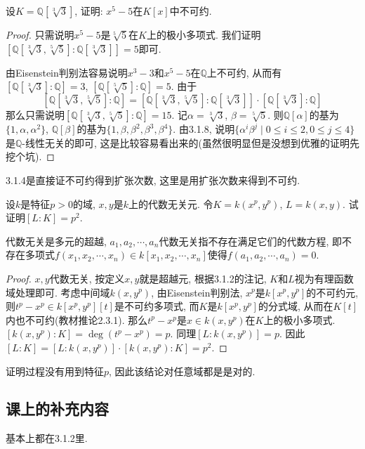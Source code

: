 \documentclass{../solutions-cn}
\begin{document}
\begin{exercise}[习题3.1.14]
    设$K = \mathbb{Q}[\sqrt[3]{3}]$, 证明: $x^5 - 5$在$K[x]$中不可约.
\end{exercise}

\begin{proof}
    只需说明$x^5 - 5$是$\sqrt[5]{5}$在$K$上的极小多项式. 我们证明$\left[\mathbb{Q}[\sqrt[3]{3}, \sqrt[5]{5}]:\mathbb{Q}[\sqrt[3]{3}]\right] = 5$即可.

    由Eisenstein判别法容易说明$x^3 - 3$和$x^5 - 5$在$\mathbb{Q}$上不可约, 从而有$\left[\mathbb{Q}[\sqrt[3]{3}]:\mathbb{Q}\right] = 3$, $\left[\mathbb{Q}[\sqrt[5]{5}]:\mathbb{Q}\right] = 5$. 由于
    \[
        \left[\mathbb{Q}[\sqrt[3]{3}, \sqrt[5]{5}]:\mathbb{Q}\right] = \left[\mathbb{Q}[\sqrt[3]{3}, \sqrt[5]{5}]:\mathbb{Q}[\sqrt[3]{3}]\right] \cdot \left[\mathbb{Q}[\sqrt[3]{3}]:\mathbb{Q}\right]
    \]
    那么只需说明$\left[\mathbb{Q}[\sqrt[3]{3}, \sqrt[5]{5}]:\mathbb{Q}\right] = 15$. 记$\alpha = \sqrt[3]{3}$, $\beta = \sqrt[5]{5}$. 则$\mathbb{Q}[\alpha]$的基为$\{1, \alpha, \alpha^2\}$, $\mathbb{Q}[\beta]$的基为$\{1, \beta, \beta^2, \beta^3, \beta^4\}$. 由3.1.8, 说明$\{\alpha^i\beta^j \mid 0 \leqslant i \leqslant 2, 0 \leqslant j \leqslant 4\}$是$\mathbb{Q}$-线性无关的即可, 这是比较容易看出来的(虽然很明显但是没想到优雅的证明先挖个坑).
\end{proof}

\begin{remark}
    3.1.4是直接证不可约得到扩张次数, 这里是用扩张次数来得到不可约.
\end{remark}

\begin{exercise}[习题3.1.15]
    设$k$是特征$p > 0$的域, $x, y$是$k$上的代数无关元. 令$K = k(x^{p}, y^{p})$, $L = k(x, y)$. 试证明$[L:K] = p^{2}$.
\end{exercise}

\begin{remark}
    代数无关是多元的超越, $a_1, a_2, \cdots, a_n$代数无关指不存在满足它们的代数方程, 即不存在多项式$f(x_1, x_2, \cdots, x_n) \in k[x_1, x_2, \cdots, x_n]$使得$f(a_1, a_2, \cdots, a_n) = 0$.
\end{remark}

\begin{proof}
    $x, y$代数无关, 按定义$x, y$就是超越元, 根据3.1.2的注记, $K$和$L$视为有理函数域处理即可. 考虑中间域$k(x, y^p)$, 由Eisenstein判别法, $x^p$是$k[x^p, y^p]$的不可约元, 则$t^p - x^p \in k[x^p, y^p][t]$是不可约多项式, 而$K$是$k[x^p, y^p]$的分式域, 从而在$K[t]$内也不可约(教材推论2.3.1). 那么$t^p - x^p$是$x \in k(x, y^p)$在$K$上的极小多项式. $[k(x, y^p):K] = \deg(t^p - x^p) = p$. 同理$[L:k(x, y^p)] = p$. 因此$[L:K] = [L:k(x, y^p)] \cdot [k(x, y^p):K] = p^2$.
\end{proof}

\begin{remark}
    证明过程没有用到特征$p$, 因此该结论对任意域都是是对的.
\end{remark}

\subsection*{课上的补充内容}
基本上都在3.1.2里.
\end{document}
